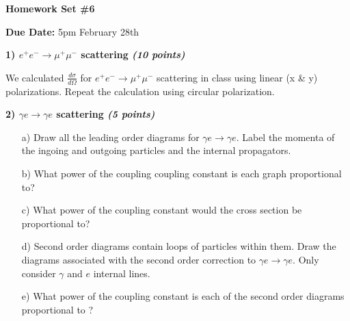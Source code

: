 


\thispagestyle{fancy}






\begin{center}
{\huge \textbf{Homework Set \#6}}
\large

{\textbf{ Due Date:} 5pm February 28th  } 
\end{center}

{\large

\textbf{1) $e^+ e^- \rightarrow \mu^+ \mu^-$ scattering   \hfill \textit{(10 points)} }

We calculated $\frac{d\sigma}{d\Omega}$ for $e^+ e^- \rightarrow \mu^+ \mu^-$ scattering in class using linear (x \& y) polarizations.
Repeat the calculation using circular polarization. 


\vspace*{0.25in}

\textbf{2)  $\gamma e \rightarrow \gamma e$ scattering \hfill \textit{(5 points)}}

\begin{itemize}

\item[a)]{ Draw all the leading order diagrams for $\gamma e \rightarrow \gamma e$.  
Label the momenta of the ingoing and outgoing particles and the internal propagators.
}
\item[b)]{What power of the coupling coupling constant is each graph proportional to?
}
\item[c)]{
What power of the coupling constant would the cross section be proportional to?
}
\item[d)]{
Second order diagrams contain loops of particles within them.  Draw the diagrams associated with the second order correction to $\gamma e \rightarrow \gamma e$.
Only consider $\gamma$ and $e$ internal lines. 
}
\item[e)]{
What power of the coupling constant is each of the second order diagrams proportional to ?
}
\end{itemize}


}






